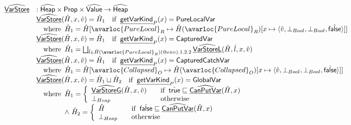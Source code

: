 \[
\begin{array}{ll}

\ahf{VarStore} & : \aHeap \times \SF{Prop} \times \aValue \rightarrow \aHeap\\
& \ahf{VarStore}(\hat{H}, x, \hat{v}) = \hat{H}_1 \quad\ifc{\chf{getVarKind}_P(x) = \SF{PureLocalVar}} \\
& \quad\wherec{\hat{H}_1 = \hat{H}[\avarloc{PureLocal}_R \mapsto \hat{H}(\avarloc{PureLocal}_R)
    [x \mapsto \langle \hat{v},\bot_{Bool},\bot_{Bool},\afalse \rangle]]} \\
& \ahf{VarStore}(\hat{H}, x, \hat{v}) = \hat{H}_1 \quad\ifc{\chf{getVarKind}_P(x) = \SF{CapturedVar}} \\
& \quad\wherec{\hat{H}_1 = \bigsqcup_{\hat{l}\in\hat{H}(\avarloc{PureLocal}_R)(\varprop{env}).1.2.2} \ahf{VarStoreL}(\hat{H},\hat{l},x,\hat{v})} \\
& \ahf{VarStore}(\hat{H}, x, \hat{v}) = \hat{H}_1 \quad\ifc{\chf{getVarKind}_P(x) = \SF{CapturedCatchVar}} \\
& \quad\wherec{\hat{H}_1 = \hat{H}[\avarloc{Collapsed}_O \mapsto \hat{H}(\avarloc{Collapsed}_O)
    [x \mapsto \langle \hat{v},\bot_{Bool},\bot_{Bool},\afalse \rangle]]} \\
& \ahf{VarStore}(\hat{H}, x, \hat{v}) = \hat{H}_1 \sqcup \hat{H}_2 
    \quad\ifc{\chf{getVarKind}_P(x) = \SF{GlobalVar}} \\
& \quad\wherec{
  \hat{H}_1 = \left\{
    \begin{array}{ll}
      \ahf{VarStoreG}(\hat{H}, x, \hat{v}) & \quad\ifc{\atrue\sqsubseteq\ahf{CanPutVar}(\hat{H}, x)} \\
      \bot_{Heap} & \quad\owc
    \end{array}
  \right. \\
  \land\ \hat{H}_2 = \left\{
    \begin{array}{ll}
      \hat{H} & \quad\ifc{\afalse \sqsubseteq \ahf{CanPutVar}(\hat{H}, x)} \\
      \bot_{Heap} & \quad\owc
    \end{array}
  \right. \\
} \\
\\


\end{array}\]
